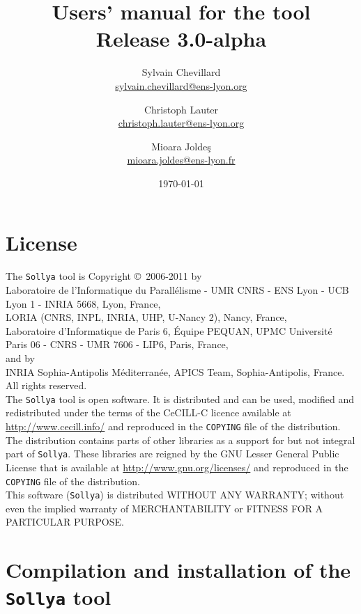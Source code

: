 \documentclass[a4paper]{article}
\title{Users' manual for the \sollya tool \\ {\large Release 3.0-alpha}}
\author{Sylvain Chevillard \\ \small{\url{sylvain.chevillard@ens-lyon.org}} \and Christoph Lauter \\ \small{\url{christoph.lauter@ens-lyon.org}} \and Mioara Jolde\c{s} \\ \small{\url{mioara.joldes@ens-lyon.fr}} }
\date{\today}
\newcommand{\sollya}{\texttt{Sollya}\xspace}
\begin{document}
\maketitle

\section*{License}

The \sollya tool is Copyright \copyright~2006-2011 by \vspace{2mm} \\
\indent Laboratoire de
l'Informatique du Parall\'elisme - UMR CNRS - ENS Lyon - UCB Lyon 1 -
INRIA 5668, Lyon, France, \vspace{2mm} \\
\indent LORIA (CNRS, INPL, INRIA, UHP, U-Nancy 2), Nancy, France, \vspace{2mm} \\
\indent Laboratoire d'Informatique de Paris 6, \'Equipe PEQUAN,
UPMC Universit\'e Paris 06 - CNRS - UMR 7606 - LIP6, Paris, France,\vspace{2mm} \\ and by \vspace{2mm} \\
\indent INRIA Sophia-Antipolis M\'editerran\'ee, APICS Team, Sophia-Antipolis, France. \vspace{2mm} \\
All rights reserved.\\[0.2cm]

\noindent The \sollya tool is open software. It is distributed and can be used,
modified and redistributed under the terms of the CeCILL-C licence
available at \url{http://www.cecill.info/} and reproduced in the
\texttt{COPYING} file of the distribution. The distribution contains
parts of other libraries as a support for but not integral part of
\sollya. These libraries are reigned by the GNU Lesser General Public
License that is available at \url{http://www.gnu.org/licenses/} and
reproduced in the \texttt{COPYING} file of the distribution.\\[0.2cm]

\noindent This software (\sollya) is distributed WITHOUT ANY WARRANTY; without even the 
implied warranty of MERCHANTABILITY or FITNESS FOR A PARTICULAR PURPOSE.

\tableofcontents

\section{Compilation and installation of the \sollya tool}
\end{document}
